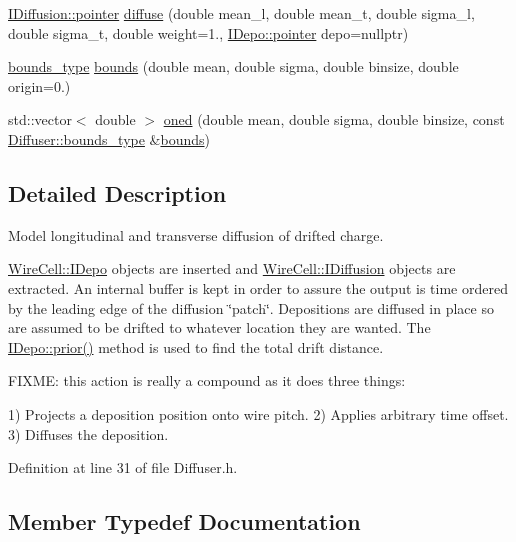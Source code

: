 \begin{DoxyCompactItemize}
\item 
\hyperlink{class_wire_cell_1_1_i_data_aff870b3ae8333cf9265941eef62498bc}{I\+Diffusion\+::pointer} \hyperlink{class_wire_cell_1_1_diffuser_adc579ba4d356101b4b9afdb8422087b6}{diffuse} (double mean\+\_\+l, double mean\+\_\+t, double sigma\+\_\+l, double sigma\+\_\+t, double weight=1., \hyperlink{class_wire_cell_1_1_i_data_aff870b3ae8333cf9265941eef62498bc}{I\+Depo\+::pointer} depo=nullptr)
\item 
\hyperlink{class_wire_cell_1_1_diffuser_a5ec949c1c222b25d1db6542dacc6d983}{bounds\+\_\+type} \hyperlink{class_wire_cell_1_1_diffuser_a2b37e9c8a8e88697620fda6acb8ef3b1}{bounds} (double mean, double sigma, double binsize, double origin=0.)
\item 
std\+::vector$<$ double $>$ \hyperlink{class_wire_cell_1_1_diffuser_a19e1586fdca351c264970065699e9c39}{oned} (double mean, double sigma, double binsize, const \hyperlink{class_wire_cell_1_1_diffuser_a5ec949c1c222b25d1db6542dacc6d983}{Diffuser\+::bounds\+\_\+type} \&\hyperlink{class_wire_cell_1_1_diffuser_a2b37e9c8a8e88697620fda6acb8ef3b1}{bounds})
\end{DoxyCompactItemize}


\subsection{Detailed Description}
Model longitudinal and transverse diffusion of drifted charge.

\hyperlink{class_wire_cell_1_1_i_depo}{Wire\+Cell\+::\+I\+Depo} objects are inserted and \hyperlink{class_wire_cell_1_1_i_diffusion}{Wire\+Cell\+::\+I\+Diffusion} objects are extracted. An internal buffer is kept in order to assure the output is time ordered by the leading edge of the diffusion \char`\"{}patch\char`\"{}. Depositions are diffused in place so are assumed to be drifted to whatever location they are wanted. The \hyperlink{class_wire_cell_1_1_i_depo_a440532d005a463cc9df5731ddb96f601}{I\+Depo\+::prior()} method is used to find the total drift distance.

F\+I\+X\+ME\+: this action is really a compound as it does three things\+:

1) Projects a deposition position onto wire pitch. 2) Applies arbitrary time offset. 3) Diffuses the deposition. 

Definition at line 31 of file Diffuser.\+h.



\subsection{Member Typedef Documentation}
\mbox{\label{class_wire_cell_1_1_diffuser_a5ec949c1c222b25d1db6542dacc6d983}} 

